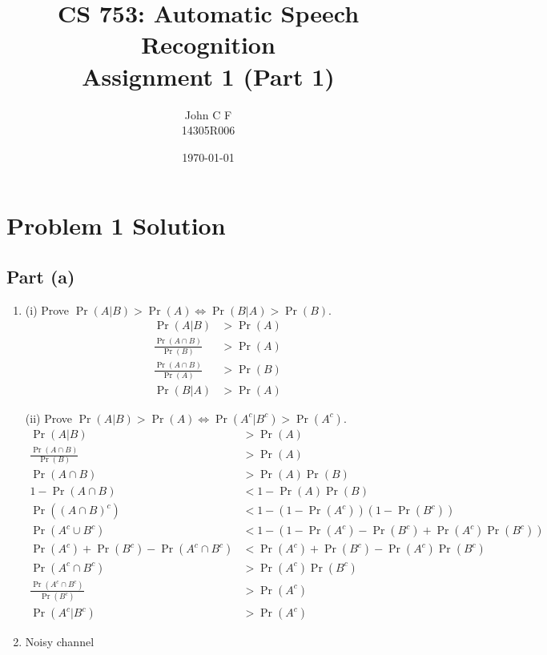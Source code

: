 \documentclass[11pt,a4paper,titlepage]{article}
\title{\blue CS 753: Automatic Speech Recognition \\
\blueb Assignment 1 (Part 1)}
\author{John C F\\
 \small 14305R006}
\date{\today}
\begin{document}
\maketitle
\newpage


\section{Problem 1 Solution}
\subsection*{Part (a)}

\addtolength{\jot}{0.25em}
\begin{enumerate}
    \item (i) Prove $\Pr(A | B) > \Pr(A) \iff \Pr(B | A) > \Pr(B)$.
        \begin{align*}
            \Pr(A | B) &> \Pr(A) \\
            \frac{\Pr(A \cap B)}{\Pr(B)} &> \Pr(A) \\
            \frac{\Pr(A \cap B)}{\Pr(A)} &> \Pr(B) \\
            \Pr(B | A) &> \Pr(A)
        \end{align*}

        (ii) Prove $\Pr(A | B) > \Pr(A) \iff \Pr(A^c | B^c) > \Pr(A^c)$.
        \begin{align*}
            \Pr(A | B) &> \Pr(A) \\
            \frac{\Pr(A \cap B)}{\Pr(B)} &> \Pr(A) \\
            \Pr(A \cap B) &> \Pr(A) \Pr(B) \\
            1 - \Pr(A \cap B) &< 1 - \Pr(A) \Pr(B) \\
            \Pr((A \cap B)^c) &< 1 - (1 - \Pr(A^c)) (1 - \Pr(B^c)) \\
            \Pr(A^c \cup B^c) &< 1 - (1 - \Pr(A^c) - \Pr(B^c) + \Pr(A^c) \Pr(B^c)) \\
            \Pr(A^c) + \Pr(B^c) - \Pr(A^c \cap B^c) &< \Pr(A^c) + \Pr(B^c) - \Pr(A^c) \Pr(B^c) \\
            \Pr(A^c \cap B^c) &> \Pr(A^c) \Pr(B^c) \\
            \frac{\Pr(A^c \cap B^c)}{\Pr(B^c)} &> \Pr(A^c) \\
            \Pr(A^c | B^c) &> \Pr(A^c)
        \end{align*}

    \item Noisy channel %
\end{enumerate}
\end{document}
